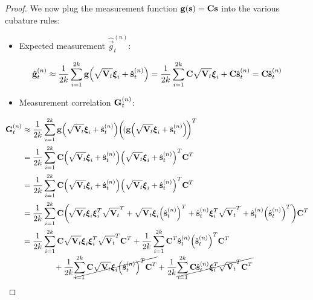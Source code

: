 \begin{proof}
			We now plug the measurement function \( \boldsymbol{\mathrm{g}}(\boldsymbol{\mathrm{s}}) = \boldsymbol{\mathrm{C}} \boldsymbol{\mathrm{s}} \) into the various cubature rules:
			\begin{itemize}
				\item Expected measurement \( \hat{\vec{g}}_t^{(n)} \):
			\end{itemize}
			\begin{align*}
				\hat{\boldsymbol{\mathrm{g}}}_t^{(n)}
					\approx \frac{1}{2k} \sum_{i = 1}^{2k} \boldsymbol{\mathrm{g}}\Big(\sqrt{\boldsymbol{\mathrm{V}}_t} \boldsymbol{\mathrm{\xi}}_i + \hat{\boldsymbol{\mathrm{s}}}_t^{(n)}\Big)
					= \frac{1}{2k} \sum_{i = 1}^{2k} \boldsymbol{\mathrm{C}} \sqrt{\boldsymbol{\mathrm{V}}_t} \boldsymbol{\mathrm{\xi}}_i + \boldsymbol{\mathrm{C}} \hat{\boldsymbol{\mathrm{s}}}_t^{(n)}
					= \boldsymbol{\mathrm{C}} \hat{\boldsymbol{\mathrm{s}}}_t^{(n)}
			\end{align*}
			\begin{itemize}
				\item Measurement correlation \( \boldsymbol{\mathrm{G}}_t^{(n)} \):
			\end{itemize}
			\begin{align*}
				\mat{G}_t^{(n)}
					&\approx \frac{1}{2k} \sum_{i = 1}^{2k} \vec{g}\Big(\sqrt{\mat{V}_t} \vec{\xi}_i + \hat{\vec{s}}_t^{(n)}\Big) \bigg(\!(\vec{g}\Big(\sqrt{\mat{V}_t} \vec{\xi}_i + \hat{\vec{s}}_t^{(n)}\Big)\!\bigg)^T \\
					&= \frac{1}{2k} \sum_{i = 1}^{2k} \mat{C} \Big(\sqrt{\mat{V}_t} \vec{\xi}_i + \hat{\vec{s}}_t^{(n)}\Big) \Big(\sqrt{\mat{V}_t} \vec{\xi}_i + \hat{\vec{s}}_t^{(n)}\Big)^T \mat{C}^T \\
					&= \frac{1}{2k} \sum_{i = 1}^{2k} \mat{C} \Big(\sqrt{\mat{V}_t} \vec{\xi}_i + \hat{\vec{s}}_t^{(n)}\Big) \Big(\sqrt{\mat{V}_t} \vec{\xi}_i + \hat{\vec{s}}_t^{(n)}\Big)^T \mat{C}^T \\
					&= \frac{1}{2k} \sum_{i = 1}^{2k} \mat{C} \bigg(\! \sqrt{\mat{V}_t} \vec{\xi}_i \vec{\xi}_i^T \sqrt{\mat{V}_t}^T + \sqrt{\mat{V}_t} \vec{\xi}_i \Big(\hat{\vec{s}}_t^{(n)}\Big)^T + \hat{\vec{s}}_t^{(n)} \vec{\xi}_i^T \sqrt{\mat{V}_t}^T + \hat{\vec{s}}_t^{(n)} \Big(\hat{\vec{s}}_t^{(n)}\Big)^T \bigg) \mat{C}^T \\
					&= \frac{1}{2k} \sum_{i = 1}^{2k} \mat{C} \sqrt{\mat{V}_t} \vec{\xi}_i \vec{\xi}_i^T \sqrt{\mat{V}_t}^T \mat{C}^T + \frac{1}{2k} \sum_{i = 1}^{2k} \mat{C}^T \hat{\vec{s}}_t^{(n)} \Big(\hat{\vec{s}}_t^{(n)}\Big)^T \mat{C}^T \\
						&\qquad\qquad + \frac{1}{2k} \cancel{\sum_{i = 1}^{2k} \mat{C} \sqrt{\mat{V}_t} \vec{\xi}_i \Big(\hat{\vec{s}}_t^{(n)}\Big)^T \mat{C}^T} + \frac{1}{2k} \cancel{\sum_{i = 1}^{2k} \mat{C} \hat{\vec{s}}_t^{(n)} \vec{\xi}_i^T \sqrt{\mat{V}_t}^T \mat{C}^T} \\

\end{align*}
\end{proof}
